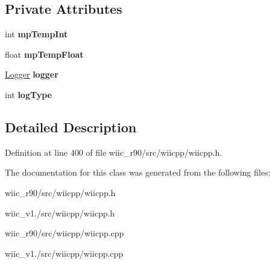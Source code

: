 \subsection*{Private Attributes}
\begin{DoxyCompactItemize}
\item 
\hypertarget{class_c_wiimote_aee9de2bf7c6e2d2933b2be46f21f4982}{int {\bfseries mp\-Temp\-Int}}\label{class_c_wiimote_aee9de2bf7c6e2d2933b2be46f21f4982}

\item 
\hypertarget{class_c_wiimote_a2617e6071bfc6712961d6b7edb79c2e5}{float {\bfseries mp\-Temp\-Float}}\label{class_c_wiimote_a2617e6071bfc6712961d6b7edb79c2e5}

\item 
\hypertarget{class_c_wiimote_a211cbf074ff990c86b441c84ad003493}{\hyperlink{class_logger}{Logger} {\bfseries logger}}\label{class_c_wiimote_a211cbf074ff990c86b441c84ad003493}

\item 
\hypertarget{class_c_wiimote_a9569ece9c54e7483b1f52a3a94ecc746}{int {\bfseries log\-Type}}\label{class_c_wiimote_a9569ece9c54e7483b1f52a3a94ecc746}

\end{DoxyCompactItemize}


\subsection{Detailed Description}


Definition at line 400 of file wiic\-\_\-r90/src/wiicpp/wiicpp.\-h.



The documentation for this class was generated from the following files\-:\begin{DoxyCompactItemize}
\item 
wiic\-\_\-r90/src/wiicpp/wiicpp.\-h\item 
wiic\-\_\-v1./src/wiicpp/wiicpp.\-h\item 
wiic\-\_\-r90/src/wiicpp/wiicpp.\-cpp\item 
wiic\-\_\-v1./src/wiicpp/wiicpp.\-cpp\end{DoxyCompactItemize}

